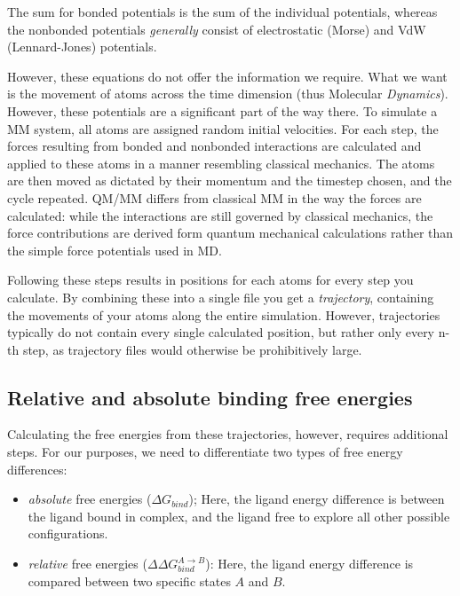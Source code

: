 \documentclass[oneside]{scrreprt}
\begin{document}
The sum for bonded potentials is the sum of the individual potentials, whereas the nonbonded potentials \emph{generally} consist of electrostatic (Morse) and VdW (Lennard-Jones) potentials.


However, these equations do not offer the information we require. What we want is the movement of atoms across the time dimension (thus Molecular \emph{Dynamics}). However, these potentials are a significant part of the way there. To simulate a MM system, all atoms are assigned  random initial velocities. For each step, the forces resulting from bonded and nonbonded interactions are calculated and applied to these atoms in a  manner resembling classical mechanics. The atoms are then moved as dictated by their momentum and the timestep chosen, and the cycle repeated. QM/MM differs from classical MM in the way the forces are calculated: while the interactions are still governed by classical mechanics, the force contributions are derived form quantum mechanical calculations rather than the simple force potentials used in MD.


Following these steps results in positions for each atoms for every step you calculate. By combining these into a single file you get a \emph{trajectory}, containing the movements of your atoms along the entire simulation. However, trajectories typically do not contain every single calculated position, but rather only every n-th step, as trajectory files would otherwise be prohibitively large.

\subsection{Relative and absolute binding free energies}

Calculating the free energies from these trajectories, however, requires additional steps. For our purposes, we need to differentiate two types of free energy differences:
\begin{itemize}
    \item \emph{absolute} free energies ($\Delta G_{bind}$); Here, the ligand energy difference is between the ligand bound in complex, and the ligand free to explore all other possible configurations.
    \item \emph{relative} free energies ($\Delta\Delta G^{A\rightarrow B}_{bind}$): Here, the ligand energy difference is compared between two specific states $A$ and $B$.
\end{itemize}
\end{document}
